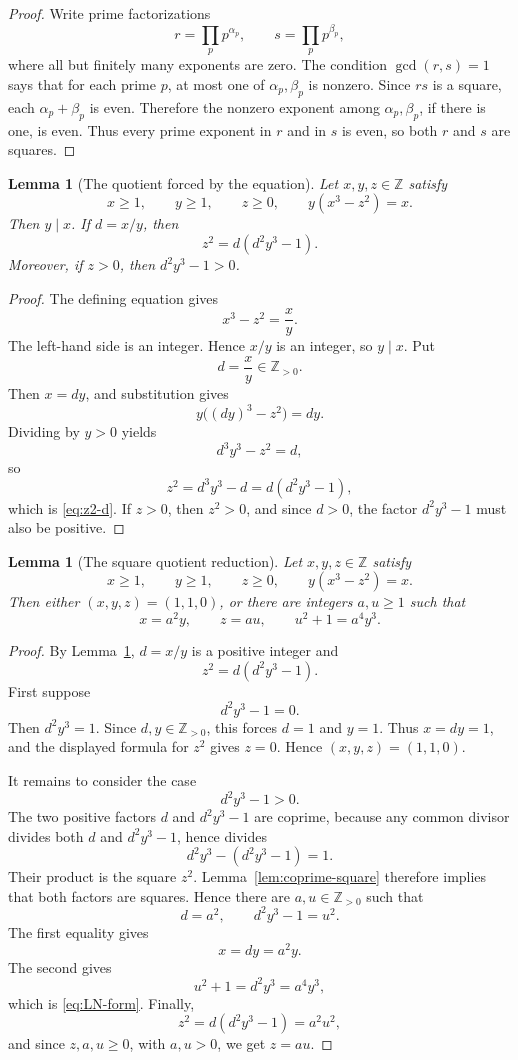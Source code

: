 \documentclass[a4paper,11pt]{amsart}
\newtheorem{lemma}[theorem]{Lemma}
\theoremstyle{remark}
\newcommand{\Z}{\mathbb Z}
\begin{document}
\begin{proof}
Write prime factorizations
\[
        r=\prod_p p^{\alpha_p},\qquad s=\prod_p p^{\beta_p},
\]
where all but finitely many exponents are zero.  The condition
$\gcd(r,s)=1$ says that for each prime $p$, at most one of
$\alpha_p,\beta_p$ is nonzero.  Since $rs$ is a square, each
$\alpha_p+\beta_p$ is even.  Therefore the nonzero exponent among
$\alpha_p,\beta_p$, if there is one, is even.  Thus every prime exponent in
$r$ and in $s$ is even, so both $r$ and $s$ are squares.
\end{proof}

\begin{lemma}[The quotient forced by the equation]\label{lem:quotient}
Let $x,y,z\in\Z$ satisfy
\[
        x\geq1,
        \qquad y\geq1,
        \qquad z\geq0,
        \qquad y(x^3-z^2)=x.
\]
Then $y\mid x$.  If $d=x/y$, then
\[
        z^2=d(d^2y^3-1).                     \tag{2.1}\label{eq:z2-d}
\]
Moreover, if $z>0$, then $d^2y^3-1>0$.
\end{lemma}

\begin{proof}
The defining equation gives
\[
        x^3-z^2=\frac{x}{y}.
\]
The left-hand side is an integer.  Hence $x/y$ is an integer, so $y\mid x$.
Put
\[
        d=\frac{x}{y}\in\Z_{>0}.
\]
Then $x=dy$, and substitution gives
\[
        y\bigl((dy)^3-z^2\bigr)=dy.
\]
Dividing by $y>0$ yields
\[
        d^3y^3-z^2=d,
\]
so
\[
        z^2=d^3y^3-d=d(d^2y^3-1),
\]
which is \eqref{eq:z2-d}.  If $z>0$, then $z^2>0$, and since $d>0$, the
factor $d^2y^3-1$ must also be positive.
\end{proof}

\begin{lemma}[The square quotient reduction]\label{lem:square-quotient}
Let $x,y,z\in\Z$ satisfy
\[
        x\geq1,
        \qquad y\geq1,
        \qquad z\geq0,
        \qquad y(x^3-z^2)=x.
\]
Then either $(x,y,z)=(1,1,0)$, or there are integers $a,u\geq1$ such that
\[
        x=a^2y,
        \qquad z=au,
        \qquad u^2+1=a^4y^3.                 \tag{2.2}\label{eq:LN-form}
\]
\end{lemma}

\begin{proof}
By Lemma~\ref{lem:quotient}, $d=x/y$ is a positive integer and
\[
        z^2=d(d^2y^3-1).
\]
First suppose
\[
        d^2y^3-1=0.
\]
Then $d^2y^3=1$.  Since $d,y\in\Z_{>0}$, this forces $d=1$ and $y=1$.
Thus $x=dy=1$, and the displayed formula for $z^2$ gives $z=0$.  Hence
$(x,y,z)=(1,1,0)$.

It remains to consider the case
\[
        d^2y^3-1>0.
\]
The two positive factors $d$ and $d^2y^3-1$ are coprime, because any common
divisor divides both $d$ and $d^2y^3-1$, hence divides
\[
        d^2y^3-(d^2y^3-1)=1.
\]
Their product is the square $z^2$.  Lemma~\ref{lem:coprime-square} therefore
implies that both factors are squares.  Hence there are $a,u\in\Z_{>0}$ such
that
\[
        d=a^2,
        \qquad d^2y^3-1=u^2.
\]
The first equality gives
\[
        x=dy=a^2y.
\]
The second gives
\[
        u^2+1=d^2y^3=a^4y^3,
\]
which is \eqref{eq:LN-form}.  Finally,
\[
        z^2=d(d^2y^3-1)=a^2u^2,
\]
and since $z,a,u\geq0$, with $a,u>0$, we get $z=au$.
\end{proof}
\end{document}
